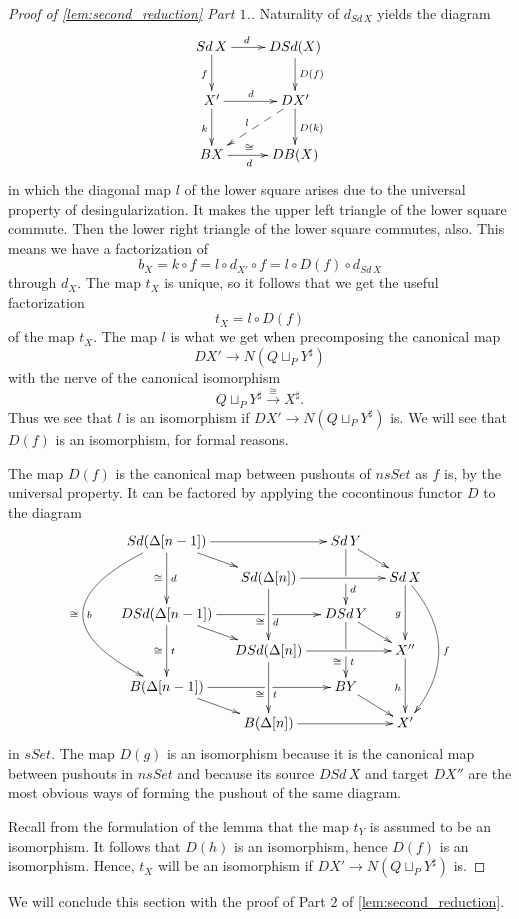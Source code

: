 \begin{proof}[Proof of \cref{lem:second_reduction} Part $1$.]
Naturality of $d_{Sd\, X}$ yields the diagram
\begin{displaymath}
\xymatrix{
Sd\, X \ar[d]_f \ar[r]^(.42)d & DSd(X) \ar[d]^{D(f)} \\
X' \ar[d]_{k} \ar[r]^(.47)d & DX' \ar@{-->}[ld]_(.53)l \ar[d]^{D(k)} \\
BX \ar[r]_(.45)d^(.45)\cong & DB(X)
}
\end{displaymath}
in which the diagonal map $l$ of the lower square arises due to the universal property of desingularization. It makes the upper left triangle of the lower square commute. Then the lower right triangle of the lower square commutes, also. This means we have a factorization of
\[b_X=k\circ f=l\circ d_{X'}\circ f=l\circ D(f)\circ d_{Sd\, X}\]
through $d_X$. The map $t_X$ is unique, so it follows that we get the useful factorization
\[t_X=l\circ D(f)\]
of the map $t_X$. The map $l$ is what we get when precomposing the canonical map
\[DX'\to N(Q \sqcup _PY^\sharp )\]
with the nerve of the canonical isomorphism
\[Q\sqcup _PY^\sharp \xrightarrow{\cong } X^\sharp .\]
Thus we see that $l$ is an isomorphism if $DX'\to N(Q \sqcup _PY^\sharp )$ is. We will see that $D(f)$ is an isomorphism, for formal reasons.

The map $D(f)$ is the canonical map between pushouts of $nsSet$ as $f$ is, by the universal property. It can be factored by applying the cocontinous functor $D$ to the diagram
\begin{displaymath}
\xymatrix@=1em{
Sd(\Delta [n-1]) \ar@/_5pc/[dddd]^b_\cong \ar[dd]_\cong ^d \ar[dr] \ar[rr] && Sd\, Y \ar@{-}[d] \ar[dr] \\
& Sd(\Delta [n]) \ar[dd]_(.6)\cong ^(.6)d \ar[rr] & \ar[d]^(.3)d & Sd\, X \ar[dd]_g \ar@/^2pc/[dddd]^f \\
DSd(\Delta [n-1]) \ar[dd]_\cong ^t \ar[dr] \ar@{-}[r] & \ar[r] & DSd\, Y \ar@{-}[d] \ar[dr] \\
& DSd(\Delta [n]) \ar[dd]_(.6)\cong ^(.6)t \ar[rr] & \ar[d]^(.3)t _(.3)\cong & X'' \ar[dd]_h \\
B(\Delta [n-1]) \ar[dr] \ar@{-}[r] & \ar[r] & BY \ar[dr] \\
& B(\Delta [n]) \ar[rr] && X'
}
\end{displaymath}
in $sSet$. The map $D(g)$ is an isomorphism because it is the canonical map between pushouts in $nsSet$ and because its source $DSd\, X$ and target $DX''$ are the most obvious ways of forming the pushout of the same diagram.

Recall from the formulation of the lemma that the map $t_Y$ is assumed to be an isomorphism. It follows that $D(h)$ is an isomorphism, hence $D(f)$ is an isomorphism. Hence, $t_X$ will be an isomorphism if $DX'\to N(Q\sqcup _PY^\sharp )$ is.
\end{proof}
\noindent We will conclude this section with the proof of Part $2$ of \cref{lem:second_reduction}.


